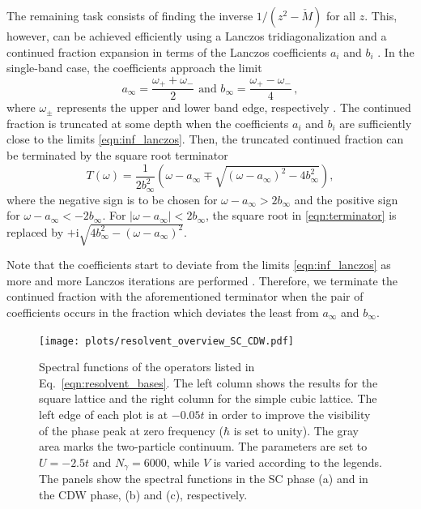 \documentclass[
    reprint, 
    aps,
    preprintnumbers,
    twocolumn,
    prb,
    superscriptaddress
]{revtex4-2}
\newcommand{\im}{\mathrm{i}}
\begin{document}
The remaining task consists of finding the inverse $1/(z^2 - \check{M})$ for all $z$.
This, however, can be achieved efficiently using a Lanczos tridiagonalization and
a continued fraction expansion in terms of the Lanczos coefficients $a_i$ and $b_i$ 
\cite{PettiforRecursion,ViswanathRecursion}.
In the single-band case, the coefficients approach the limit
\begin{equation}
    \label{eqn:inf_lanczos}
    a_\infty = \frac{\omega_+ + \omega_-}{2}\text{  and  } b_\infty = \frac{\omega_+ - \omega_-}{4}\,,
\end{equation}
where $\omega_\pm$ represents the upper and lower band edge, respectively \cite{PettiforRecursion}.
The continued fraction is truncated at some depth when the coefficients $a_i$ and $b_i$ are sufficiently
close to the limits \eqref{eqn:inf_lanczos}. Then, the truncated continued fraction can be terminated by the
square root terminator
\begin{equation}
\label{eqn:terminator}
    T(\omega) = \frac{1}{2b_\infty^2} 
		\left( \omega - a_\infty \mp \sqrt{(\omega - a_\infty)^2 - 4 b_\infty^2} \right),
\end{equation}
where the negative sign is to be chosen for $\omega - a_\infty > 2b_\infty$ and the positive sign for
$\omega - a_\infty < -2b_\infty$. For $|\omega - a_\infty| < 2b_\infty$, the square root in \eqref{eqn:terminator}
is replaced by $+\im\sqrt{4 b_\infty^2 - (\omega - a_\infty)^2}$.

Note that the coefficients start to deviate from the limits \eqref{eqn:inf_lanczos} as more and more Lanczos iterations are performed \cite{ViswanathRecursion}.
Therefore, we terminate the continued fraction with the aforementioned terminator when the pair of coefficients 
occurs in the fraction which deviates the least from $a_\infty$ and $b_\infty$.



\begin{figure}
    \centering
    \texttt{[image: plots/resolvent\_overview\_SC\_CDW.pdf]}
    \caption{Spectral functions of the operators listed in Eq.~\eqref{eqn:resolvent_bases}.
    The left column shows the results for the square lattice and the right column for the simple cubic lattice.
    The left edge of each plot is at $-0.05t$  in order to improve the visibility of the phase peak at zero frequency
		($\hbar$ is set to unity). The gray area marks the two-particle continuum.
    The parameters are set to $U=-2.5t$ and $N_\gamma = 6000$, while $V$ is varied according to the legends.
    The panels show the spectral functions in the SC phase (a) and in the CDW phase, (b) and (c), respectively.}
    \label{fig:resolvent_overview_SC}
\end{figure}
\end{document}
